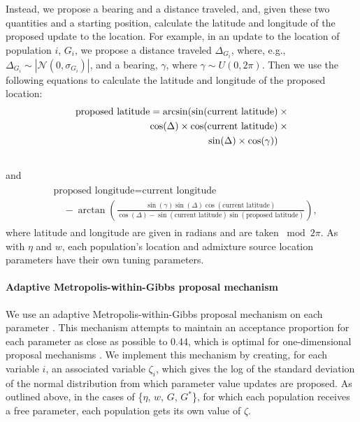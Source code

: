 \documentclass[10pt,letterpaper]{article}
\newcommand{\identifyadmixsource}[1]{{#1^{*}}}
\begin{document}
Instead, we propose a bearing and a distance traveled, and, given these two quantities and a starting position, calculate the latitude and longitude of the proposed update to the location.  For example, in an update to the location of population $i$, $G_i$, we propose a distance traveled $\Delta_{{G}_i}$, where, e.g., $\Delta_{G_i}  \sim | \mathcal{N}(0,\sigma_{{G}_i})|$, and a bearing, $\gamma$, where $\gamma \sim U(0,2\pi)$.  Then we use the following equations to calculate the latitude and longitude of the proposed location:
\begin{align}
\text{proposed latitude} = \arcsin(\sin(\text{current latitude}) \: &\times\\  \notag
					\cos(\Delta) \times \cos(\text{current latitude}) \:&\times\\  \notag
					\sin(\Delta) \times \cos(\gamma))   \:&\phantom{\times}\\  \notag
\end{align}
and
\begin{align}
  \begin{split}
    & \text{proposed longitude} =  \text{current longitude} \\
    & \quad {} - \arctan\left(
                        \frac{
							\sin(\gamma)
							\sin(\Delta) 
                            \cos(\text{current latitude}) 
                          }{
                           \cos(\Delta) - 
                           \sin(\text{current latitude}) 
                          \sin(\text{proposed latitude})
                        } \right) ,
    \end{split}
\end{align}
where latitude and longitude are given in radians and are taken ${}\bmod 2\pi$.
As with $\eta$ and $w$, each population's location and admixture source location parameters have their own tuning parameters.


\paragraph{Adaptive Metropolis-within-Gibbs proposal mechanism}
We use an adaptive Metropolis-within-Gibbs proposal mechanism on each parameter \cite{roberts2009examples,rosenthal2010_optimal}.  This mechanism attempts to maintain an acceptance proportion for each parameter as close as possible to 0.44, which is optimal for one-dimensional proposal mechanisms \cite{Roberts1997,Roberts2001}.  We implement this mechanism by creating, for each variable $i$, an associated variable $\zeta_i$, which gives the log of the standard deviation of the normal distribution from which parameter value updates are proposed.  As outlined above, in the cases of \{$\eta$, $w$, $G$, $\identifyadmixsource{G}$\}, for which each population receives a free parameter, each population gets its own value of $\zeta$.  
\end{document}
